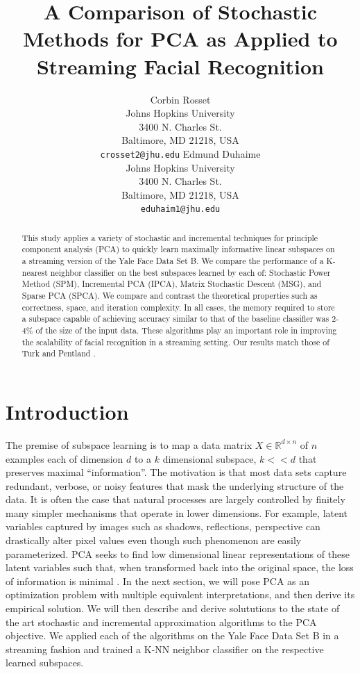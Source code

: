 \documentclass[11pt,letterpaper]{article}
\title{A Comparison of Stochastic Methods for PCA as Applied to Streaming Facial Recognition}
\author{Corbin Rosset\\
  Johns Hopkins University\\
  3400 N. Charles St.\\
  Baltimore, MD 21218, USA\\
  {\tt crosset2@jhu.edu}
  \And
  Edmund Duhaime \\
  Johns Hopkins University\\
  3400 N. Charles St.\\
  Baltimore, MD 21218, USA\\
  {\tt eduhaim1@jhu.edu}}
\date{}
\begin{document}
\maketitle
\begin{abstract}
  This study applies a variety of stochastic and incremental techniques for principle component analysis (PCA) to quickly learn maximally informative linear subspaces on a streaming version of the Yale Face Data Set B\cite{yale}. We compare the performance of a K-nearest neighbor classifier on the best subspaces learned by each of: Stochastic Power Method (SPM), Incremental PCA (IPCA), Matrix Stochastic Descent (MSG), and Sparse PCA (SPCA). We compare and contrast the theoretical properties such as correctness, space, and iteration complexity. In all cases, the memory required to store a subspace capable of achieving accuracy similar to that of the baseline classifier was  2-4$\%$ of the size of the input data. These algorithms play an important role in improving the scalability of facial recognition in a streaming setting. Our results match those of Turk and Pentland \cite{turk}. 
\end{abstract}

\section{Introduction}

The premise of subspace learning is to map a data matrix $X \in \mathbb{R}^{d \times n}$ of $n$ examples each of dimension $d$ to a $k$ dimensional subspace, $k << d$ that preserves maximal ``information''. The motivation is that most data sets capture redundant, verbose, or noisy features that mask the underlying structure of the data.  It is often the case that natural processes are largely controlled by finitely many simpler mechanisms that operate in lower dimensions. For example, latent variables captured by images such as shadows, reflections, perspective can drastically alter pixel values even though such phenomenon are easily parameterized. PCA seeks to find low dimensional linear representations of these latent variables such that, when transformed back into the original space, the loss of information is minimal \cite{jolliffe}. In the next section, we will pose PCA as an optimization problem with multiple equivalent interpretations, and then derive its empirical solution. We will then describe and derive solututions to the state of the art stochastic and incremental approximation algorithms to the PCA objective. We applied each of the algorithms on the Yale Face Data Set B in a streaming fashion and trained a K-NN neighbor classifier on the respective learned subspaces. 
\end{document}
